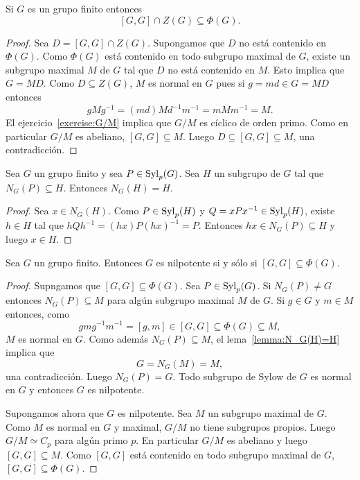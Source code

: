 \begin{theorem}
	\label{theorem:Gaschutz}
	Si $G$ es un grupo finito entonces 
	\[
	[G,G]\cap Z(G)\subseteq\Phi(G).
	\]
\end{theorem}

\begin{proof}
	Sea $D=[G,G]\cap Z(G)$. Supongamos que $D$ no está contenido en $\Phi(G)$.
	Como $\Phi(G)$ está contenido en todo subgrupo maximal de $G$, existe un
	subgrupo maximal $M$ de $G$ tal que $D$ no está contenido en $M$.  Esto
	implica que $G=MD$. Como $D\subseteq Z(G)$, $M$ es normal en $G$ pues si
	$g=md\in G=MD$ entonces
	\[
		gMg^{-1}=(md)Md^{-1}m^{-1}=mMm^{-1}=M.
	\]
	El ejercicio~\ref{exercise:G/M} implica que $G/M$ es cíclico de orden
	primo. Como en particular $G/M$ es abeliano, $[G,G]\subseteq M$. Luego
	$D\subseteq [G,G]\subseteq M$, una contradicción.
\end{proof}

\begin{lemma}
	\label{lemma:N_G(H)=H}
	Sea $G$ un grupo finito y sea $P\in\mathrm{Syl}_p(G)$. Sea $H$ un subgrupo de $G$
	tal que $N_G(P)\subseteq H$. Entonces $N_G(H)=H$.
\end{lemma}

\begin{proof}
	Sea $x\in N_G(H)$. Como $P\in\mathrm{Syl}_p(H)$ y $Q=xPx^{-1}\in\mathrm{Syl}_p(H)$, existe
	$h\in H$ tal que $hQh^{-1}=(hx)P(hx)^{-1}=P$. Entonces $hx\in
	N_G(P)\subseteq H$ y luego $x\in H$. 
\end{proof}

\begin{theorem}[Wielandt]
	\label{theorem:Wielandt}
	Sea $G$ un grupo finito. Entonces $G$ es nilpotente si y sólo si
	$[G,G]\subseteq\Phi(G)$.
\end{theorem}

\begin{proof}
	Supngamos que $[G,G]\subseteq\Phi(G)$. Sea $P\in\mathrm{Syl}_p(G)$. Si $N_G(P)\ne
	G$ entonces $N_G(P)\subseteq M$ para algún subgrupo maximal $M$ de $G$. Si
	$g\in G$ y $m\in M$ entonces, como 
	\[
		gmg^{-1}m^{-1}=[g,m]\in [G,G]\subseteq\Phi(G)\subseteq M,
	\]
	$M$ es normal en $G$. Como además $N_G(P)\subseteq M$, el
	lema~\ref{lemma:N_G(H)=H} implica que 
	\[
	G=N_G(M)=M,
	\]
	una contradicción.
	Luego $N_G(P)=G$. Todo subgrupo de Sylow de $G$ es normal en $G$ y entonces
	$G$ es nilpotente.

	Supongamos ahora que $G$ es nilpotente. Sea $M$ un subgrupo maximal de $G$.
	Como $M$ es normal en $G$ y maximal, $G/M$ no tiene subgrupos propios.
	Luego $G/M\simeq C_p$ para algún primo $p$. En particular $G/M$ es abeliano
	y luego $[G,G]\subseteq M$. Como $[G,G]$ está contenido en
	todo subgrupo maximal de $G$, $[G,G]\subseteq\Phi(G)$.
\end{proof}

